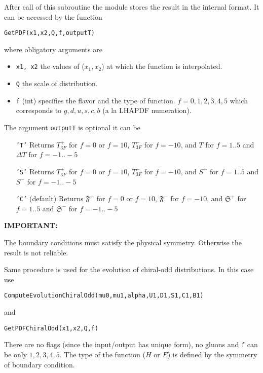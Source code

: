 \documentclass[prd,nofootinbib,eqsecnum,final]{revtex4}
\renewcommand{\(}{\left(}
\renewcommand{\)}{\right)}
\renewcommand{\[}{\left[}
\renewcommand{\]}{\right]}
\newcommand{\red}[1]{{\color[rgb]{1,0,0} #1}}
\begin{document}
After call of this subroutine the module stores the result in the internal format. It can be accessed by the function
\begin{center}
\texttt{GetPDF(x1,x2,Q,f,outputT)}
\end{center}
where obligatory arguments are
\begin{itemize}
\item \texttt{x1, x2} the values of ($x_1,x_2$) at which the function is interpolated.
\item \texttt{Q} the scale of distribution.
\item \texttt{f} (int) specifies the flavor and the type of function. $f=0,1,2,3,4,5$ which corresponds to $g, d, u, s, c, b$ (a la LHAPDF numeration).
\end{itemize}
The argument \texttt{outputT} is optional it can be
\begin{itemize}
\item[\texttt{'T'}] Returns $T^+_{3F}$ for $f=0$ or $f=10$, $T^-_{3F}$ for $f=-10$, and $T$ for $f=1..5$ and $\Delta T$ for $f=-1..-5$
\item[\texttt{'S'}] Returns $T^+_{3F}$ for $f=0$ or $f=10$, $T^-_{3F}$ for $f=-10$, and $S^+$ for $f=1..5$ and $S^-$ for $f=-1..-5$
\item[\texttt{'C'}] (default) Returns $\mathfrak{F}^+$ for $f=0$ or $f=10$, $\mathfrak{F}^-$ for $f=-10$, and $\mathfrak{S}^+$ for $f=1..5$ and $\mathfrak{S}^-$ for $f=-1..-5$
\end{itemize}

\begin{tcolorbox}
\begin{center}
\textbf{\red{IMPORTANT:}}

The boundary conditions must satisfy the physical symmetry. Otherwise the result is not reliable.
\end{center}
\end{tcolorbox}

Same procedure is used for the evolution of chiral-odd distributions. In this case use
\begin{center}
\texttt{ComputeEvolutionChiralOdd(mu0,mu1,alpha,U1,D1,S1,C1,B1)}
\end{center}
and
\begin{center}
\texttt{GetPDFChiralOdd(x1,x2,Q,f)}
\end{center}
There are no flags (since the input/output has unique form), no gluons and \texttt{f} can be only $1,2,3,4,5$. The type of the function ($H$ or $E$) is defined by the symmetry of boundary condition.
\end{document}

